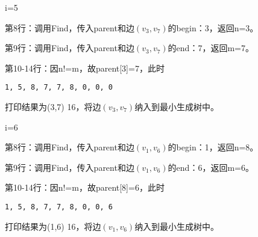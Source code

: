 \begin{frame}\ft{\subsubsecname}
\begin{figure}

\end{figure}
\end{frame}


\begin{frame}[fragile]\ft{\subsubsecname}
\tf i=5
\vspace{0.05in}

第8行：调用Find，传入parent和边$(v_3,v_7)$的begin：3，返回n=3。 \vspace{0.05in}

第9行：调用Find，传入parent和边$(v_3,v_7)$的end：7，返回m=7。 \vspace{0.05in}

第10-14行：因n!=m，故parent[3]=7，此时
\begin{lstlisting}[xleftmargin=2em]
1, 5, 8, 7, 7, 8, 0, 0, 0
\end{lstlisting}
打印结果为(3,7) 16，将边$(v_3,v_7)$纳入到最小生成树中。
\end{frame}

\begin{frame}\ft{\subsubsecname}
\begin{figure}

\end{figure}
\end{frame}


\begin{frame}[fragile]\ft{\subsubsecname}
\tf i=6
\vspace{0.05in}

第8行：调用Find，传入parent和边$(v_1,v_6)$的begin：1，返回n=8。 \vspace{0.05in}

第9行：调用Find，传入parent和边$(v_1,v_6)$的end：6，返回m=6。 \vspace{0.05in}

第10-14行：因n!=m，故parent[8]=6，此时
\begin{lstlisting}[xleftmargin=2em]
1, 5, 8, 7, 7, 8, 0, 0, 6
\end{lstlisting}
打印结果为(1,6) 16，将边$(v_1,v_6)$纳入到最小生成树中。
\end{frame}

